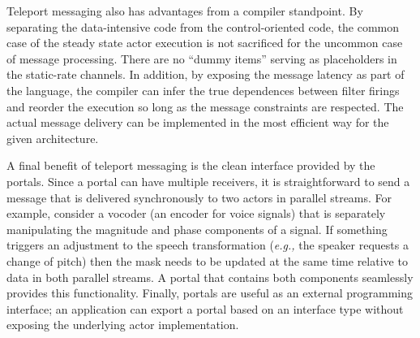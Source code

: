Teleport messaging also has advantages from a compiler standpoint.  By
separating the data-intensive code from the control-oriented code, the
common case of the steady state actor execution is not sacrificed for
the uncommon case of message processing.  There are no ``dummy items''
serving as placeholders in the static-rate channels.  In addition, by
exposing the message latency as part of the language, the compiler can
infer the true dependences between filter firings and reorder the
execution so long as the message constraints are respected.  The
actual message delivery can be implemented in the most efficient way
for the given architecture.



A final benefit of teleport messaging is the clean interface provided
by the portals.  Since a portal can have multiple receivers, it is
straightforward to send a message that is delivered synchronously to
two actors in parallel streams.  For example, consider a vocoder (an
encoder for voice signals) that is separately manipulating the
magnitude and phase components of a signal.  If something triggers an
adjustment to the speech transformation ({\it e.g.,} the speaker
requests a change of pitch) then the mask needs to be updated at the
same time relative to data in both parallel streams.  A portal that
contains both components seamlessly provides this functionality.
Finally, portals are useful as an external programming interface; an
application can export a portal based on an interface type without
exposing the underlying actor implementation.


